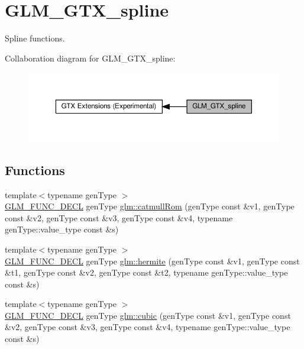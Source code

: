 \hypertarget{group__gtx__spline}{}\section{G\+L\+M\+\_\+\+G\+T\+X\+\_\+spline}
\label{group__gtx__spline}


Spline functions.  


Collaboration diagram for G\+L\+M\+\_\+\+G\+T\+X\+\_\+spline\+:\nopagebreak
\begin{figure}[H]
\begin{center}
\leavevmode
\includegraphics[width=350pt]{group__gtx__spline}
\end{center}
\end{figure}
\subsection*{Functions}
\begin{DoxyCompactItemize}
\item 
{\footnotesize template$<$typename gen\+Type $>$ }\\\hyperlink{setup_8hpp_ab2d052de21a70539923e9bcbf6e83a51}{G\+L\+M\+\_\+\+F\+U\+N\+C\+\_\+\+D\+E\+CL} gen\+Type \hyperlink{group__gtx__spline_ga8119c04f8210fd0d292757565cd6918d}{glm\+::catmull\+Rom} (gen\+Type const \&v1, gen\+Type const \&v2, gen\+Type const \&v3, gen\+Type const \&v4, typename gen\+Type\+::value\+\_\+type const \&s)
\item 
{\footnotesize template$<$typename gen\+Type $>$ }\\\hyperlink{setup_8hpp_ab2d052de21a70539923e9bcbf6e83a51}{G\+L\+M\+\_\+\+F\+U\+N\+C\+\_\+\+D\+E\+CL} gen\+Type \hyperlink{group__gtx__spline_gaa69e143f6374d32f934a8edeaa50bac9}{glm\+::hermite} (gen\+Type const \&v1, gen\+Type const \&t1, gen\+Type const \&v2, gen\+Type const \&t2, typename gen\+Type\+::value\+\_\+type const \&s)
\item 
{\footnotesize template$<$typename gen\+Type $>$ }\\\hyperlink{setup_8hpp_ab2d052de21a70539923e9bcbf6e83a51}{G\+L\+M\+\_\+\+F\+U\+N\+C\+\_\+\+D\+E\+CL} gen\+Type \hyperlink{group__gtx__spline_ga6b867eb52e2fc933d2e0bf26aabc9a70}{glm\+::cubic} (gen\+Type const \&v1, gen\+Type const \&v2, gen\+Type const \&v3, gen\+Type const \&v4, typename gen\+Type\+::value\+\_\+type const \&s)
\end{DoxyCompactItemize}


